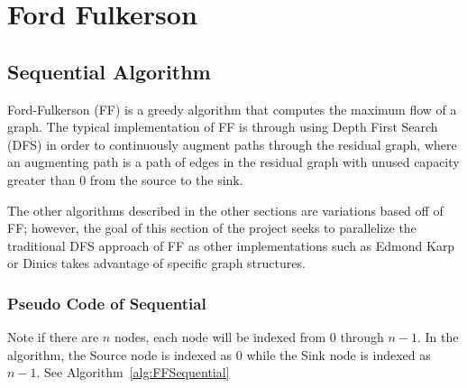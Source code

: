 \section{Ford Fulkerson}

\subsection{Sequential Algorithm}
    Ford-Fulkerson (FF) is a greedy algorithm that computes the maximum flow of a graph.  The typical implementation of FF is through using Depth First Search (DFS) in order to continuously augment paths through the residual graph, where an augmenting path is a path of edges in the residual graph with unused capacity greater than 0 from the source to the sink. \cite{FF-Fiset}
    
    The other algorithms described in the other sections are variations based off of FF; however, the goal of this section of the project seeks to parallelize the traditional DFS approach \cite{FFvEk} of FF as other implementations such as Edmond Karp or Dinics takes advantage of specific graph structures.
    \newline
    
    \subsubsection{Pseudo Code of Sequential}
    Note if there are $n$ nodes, each node will be indexed from 0 through $n-1$. In the algorithm, the Source node is indexed as 0 while the Sink node is indexed as $n-1$. See Algorithm~\ref{alg:FFSequential}

